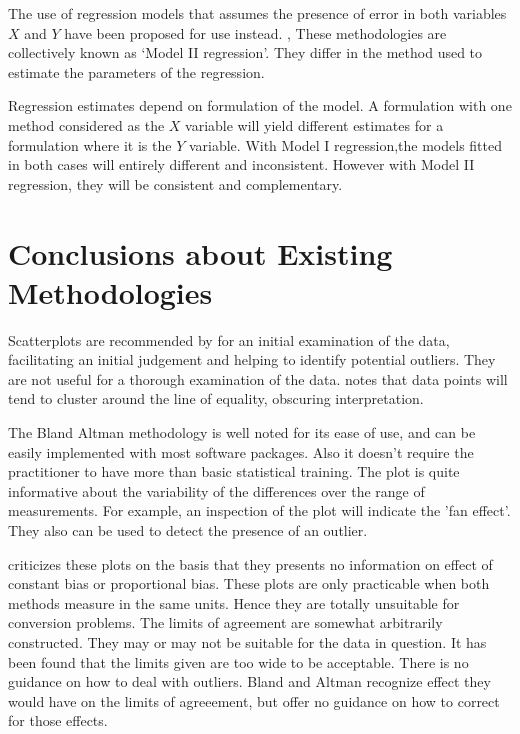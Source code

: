 \documentclass[12pt, a4paper]{report}
\theoremstyle{plain}
\theoremstyle{definition}
\theoremstyle{remark}
\begin{document}
The use of regression models that assumes the presence of error in both variables $X$ and $Y$ have been proposed for use instead.
\citep{CornCoch,ludbrook97}, These methodologies are collectively known as `Model II regression'. They differ in the method used to
estimate the parameters of the regression.

Regression estimates depend on formulation of the model. A formulation with one method considered as the $X$ variable will
yield different estimates for a formulation where it is the $Y$ variable. With Model I regression,the models fitted in both cases
will entirely different and inconsistent. However with Model II
regression, they will be consistent and complementary.


\section{Conclusions about Existing Methodologies}

Scatterplots are recommended by \citet{BA83} for an initial
examination of the data, facilitating an initial judgement and
helping to identify potential outliers. They are not useful for a
thorough examination of the data. \citet{BritHypSoc} notes that
data points will tend to cluster around the line of equality,
obscuring interpretation.


The Bland Altman methodology is well noted for its ease of use,
and can be easily implemented with most software packages. Also it
doesn't require the practitioner to have more than basic
statistical training. The plot is quite informative about the
variability of the differences over the range of measurements. For
example, an inspection of the plot will indicate the 'fan effect'.
They also can be used to detect the presence of an outlier.

\citet{ludbrook97,ludbrook02}criticizes these plots on the
basis that they presents no information on effect of constant bias
or proportional bias. These plots are only practicable when both
methods measure in the same units. Hence they are totally
unsuitable for conversion problems. The limits of agreement are
somewhat arbitrarily constructed. They may or may not be suitable
for the data in question. It has been found that the limits given
are too wide to be acceptable. There is no guidance on how to deal
with outliers. Bland and Altman recognize effect they would have
on the limits of agreeement, but offer no guidance on how to
correct for those effects.
\end{document}
